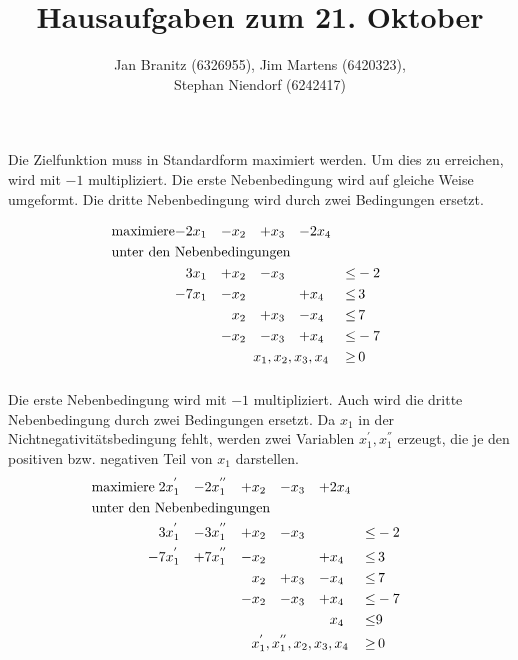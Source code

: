 \documentclass[10pt,a4paper,oneside,ngerman,numbers=noenddot]{scrartcl}
\begin{document}
\author{Jan Branitz (6326955), Jim Martens (6420323),\\
Stephan Niendorf (6242417)}
\title{Hausaufgaben zum 21. Oktober}
\maketitle
\section{} %
	\subsection{} %
		\subsubsection{} %
		Die Zielfunktion muss in Standardform maximiert werden. Um dies zu erreichen, wird mit $-1$ multipliziert. Die erste Nebenbedingung wird auf gleiche Weise umgeformt. Die dritte Nebenbedingung wird durch zwei Bedingungen ersetzt.
		
		\begin{alignat*}{5}
		\text{maximiere} -& 2x_{1} &-& x_{2} &+& x_{3} &-& 2x_{4} && \\
		\multicolumn{10}{l}{\text{unter den Nebenbedingungen}} && \\
		& 3x_{1} &+& x_{2} &-& x_{3} && &\leq & -2 \\
		-& 7x_{1} &-& x_{2} && &+& x_{4} &\leq &\, 3 \\
		& && x_{2} &+& x_{3} &-& x_{4} &\leq &\, 7 \\
		& &-& x_{2} &-& x_{3} &+& x_{4} &\leq & -7 \\
		\multicolumn{8}{r}{$x_{1}, x_{2}, x_{3}, x_{4}$} \,&\geq &\, 0
		\end{alignat*}
		\subsubsection{} %
		Die erste Nebenbedingung wird mit $-1$ multipliziert. Auch wird die dritte Nebenbedingung durch zwei Bedingungen ersetzt. Da $x_{1}$ in der Nichtnegativitätsbedingung fehlt, werden zwei Variablen $x_{1}^{'}, x_{1}^{''}$ erzeugt, die je den positiven bzw. negativen Teil von $x_{1}$ darstellen.
		\begin{alignat*}{6}
		\text{maximiere}\; & 2x_{1}^{'} &-& 2x_{1}^{''} &+& x_{2} &-& x_{3} &+& 2x_{4} && \\
		\multicolumn{12}{l}{\text{unter den Nebenbedingungen}} && \\
		& 3x_{1}^{'} &-& 3x_{1}^{''} &+& x_{2} &-& x_{3} && &\leq & -2 \\
		-& 7x_{1}^{'} &+& 7x_{1}^{''} &-& x_{2} && &+& x_{4} &\leq &\, 3 \\
		& && && x_{2} &+& x_{3} &-& x_{4} &\leq &\, 7 \\
		& && &-& x_{2} &-& x_{3} &+& x_{4} &\leq & -7 \\
		& && && && && x_{4} &\leq & 9 \\
		\multicolumn{10}{r}{$x_{1}^{'}, x_{1}^{''}, x_{2}, x_{3}, x_{4}$} \,&\geq &\, 0
		\end{alignat*}
\end{document}

